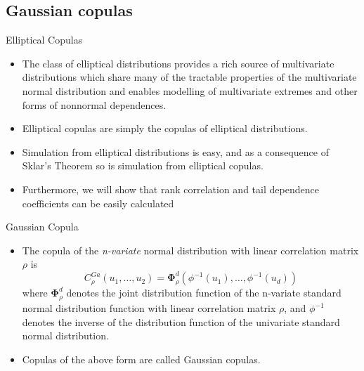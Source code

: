 \documentclass[11pt]{beamer}
\theoremstyle{plain}
\theoremstyle{definition}
\theoremstyle{remark}
\begin{document}
\subsection{Gaussian copulas}
\begin{frame}{Elliptical Copulas}
   \begin{itemize}
      \item  The class of elliptical distributions provides a rich source of multivariate distributions which share many of the tractable 
      properties of the multivariate normal distribution and enables modelling of multivariate extremes and other forms of nonnormal 
      dependences. 
      \item Elliptical copulas are simply the copulas of elliptical distributions. 
      \item Simulation from elliptical distributions is easy, and as a consequence of Sklar’s Theorem so is simulation from elliptical copulas. 		
      \item Furthermore, we will show that rank correlation and tail dependence coefficients can be easily calculated
   \end{itemize}
\end{frame}
%
\begin{frame}{Gaussian Copula}
   \begin{itemize}
      \item The copula of the \textit{n-variate} normal distribution with linear correlation matrix $\rho$ is
		$$
		C_\rho^{Ga} (u_1, \dots, u_2) = \mathbf{\Phi}^d_\rho (\phi^{-1}(u_1), \dots, 
		\phi^{-1}(u_d)) 
		$$
		where $\mathbf{\Phi}^d_\rho$ denotes the joint distribution function of the n-variate standard normal distribution function with 
		linear correlation matrix $\rho$, and $\phi^{-1}$ denotes the inverse of the distribution function of the univariate standard normal 
		distribution. 
		
		\item Copulas of the above form are called Gaussian copulas.
   \end{itemize}
\end{frame}
%
\end{document}
